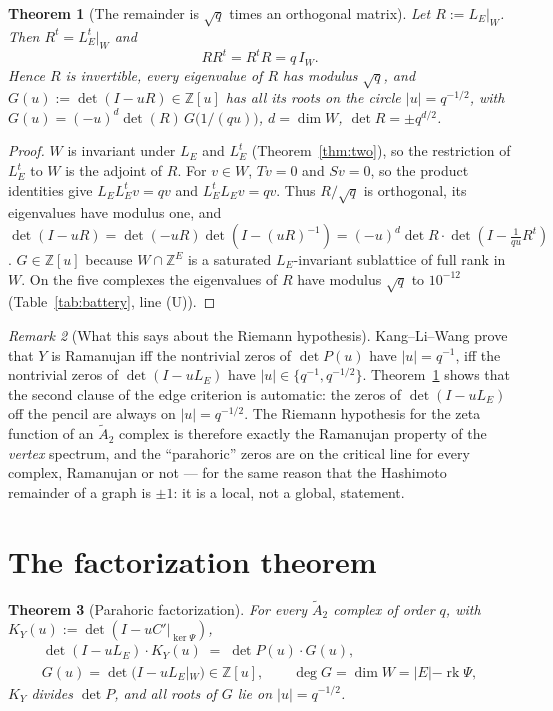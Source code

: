\documentclass[11pt]{amsart}
\numberwithin{equation}{section}
\newtheorem{theorem}{Theorem}[section]
\theoremstyle{definition}
\theoremstyle{remark}
\newtheorem{remark}[theorem]{Remark}
\newcommand{\Z}{\mathbb{Z}}
\newcommand{\LE}{L_E}
\newcommand{\Atwo}{\widetilde A_2}
\newcommand{\rk}{\operatorname{rk}}
\begin{document}
\begin{theorem}[The remainder is $\sqrt q$ times an orthogonal matrix]\label{thm:unitary}
Let $R:=\LE|_W$. Then $R^{t}=\LE^{t}|_W$ and
\[
RR^{t}=R^{t}R=q\,I_W .
\]
Hence $R$ is invertible, every eigenvalue of $R$ has modulus $\sqrt q$, and
$G(u):=\det(I-uR)\in\Z[u]$ has all its roots on the circle $|u|=q^{-1/2}$, with
$G(u)=(-u)^{d}\det(R)\,G\bigl(1/(qu)\bigr)$, $d=\dim W$, $\det R=\pm q^{d/2}$.
\end{theorem}

\begin{proof}
$W$ is invariant under $\LE$ and $\LE^{t}$ (Theorem~\ref{thm:two}), so the restriction of
$\LE^{t}$ to $W$ is the adjoint of $R$. For $v\in W$, $Tv=0$ and $Sv=0$, so the product
identities give $\LE\LE^{t}v=qv$ and $\LE^{t}\LE v=qv$. Thus $R/\sqrt q$ is orthogonal, its
eigenvalues have modulus one, and $\det(I-uR)=\det(-uR)\det(I-(uR)^{-1})
=(-u)^{d}\det R\cdot\det(I-\tfrac1{qu}R^{t})$. $G\in\Z[u]$ because $W\cap\Z^{E}$ is a
saturated $\LE$-invariant sublattice of full rank in $W$. On the five complexes the
eigenvalues of $R$ have modulus $\sqrt q$ to $10^{-12}$ (Table~\ref{tab:battery}, line (U)).
\end{proof}

\begin{remark}[What this says about the Riemann hypothesis]\label{rem:RH}
Kang--Li--Wang \cite[Thm.~1.5.1]{KLW} prove that $Y$ is Ramanujan iff the nontrivial zeros of
$\det P(u)$ have $|u|=q^{-1}$, iff the nontrivial zeros of $\det(I-u\LE)$ have $|u|\in\{q^{-1},
q^{-1/2}\}$. Theorem~\ref{thm:unitary} shows that the second clause of the edge criterion is
automatic: the zeros of $\det(I-u\LE)$ off the pencil are always on $|u|=q^{-1/2}$. The
Riemann hypothesis for the zeta function of an $\Atwo$ complex is therefore exactly the
Ramanujan property of the \emph{vertex} spectrum, and the ``parahoric'' zeros are on the
critical line for every complex, Ramanujan or not --- for the same reason that the Hashimoto
remainder of a graph is $\pm1$: it is a local, not a global, statement.
\end{remark}

\section{The factorization theorem}\label{sec:factor}

\begin{theorem}[Parahoric factorization]\label{thm:factor}
For every $\Atwo$ complex of order $q$, with $K_Y(u):=\det(I-uC'|_{\ker\Psi})$,
\begin{gather*}
\det(I-u\LE)\cdot K_Y(u)\;=\;\det P(u)\cdot G(u),\\
G(u)=\det(I-u\LE|_W)\in\Z[u],\qquad \deg G=\dim W=|E|-\rk\Psi ,
\end{gather*}
$K_Y$ divides $\det P$, and all roots of $G$ lie on $|u|=q^{-1/2}$.
\end{theorem}
\end{document}
